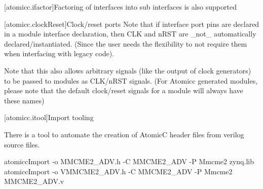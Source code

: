 [atomicc.ifactor]{Factoring of interfaces into sub interfaces is also supported}

[atomicc.clockReset]{Clock/reset ports}
Note that if interface port pins are declared in a module interface declaration, then
CLK and nRST are _not_ automatically declared/instantiated.  (Since the user needs the
flexibility to not require them when interfacing with legacy code).

Note that this also allows arbitrary signals (like the output of clock generators) to be
passed to modules as CLK/nRST signals.  (For Atomicc generated modules, please note that the
default clock/reset signals for a module will always have these names)

[atomicc.itool]{Import tooling}

There is a tool to automate the creation of AtomicC header files from verilog source files.
\begin{example}
\begin{codeblock}
     atomiccImport -o MMCME2_ADV.h -C MMCME2_ADV -P Mmcme2 zynq.lib
     atomiccImport -o VMMCME2_ADV.h -C MMCME2_ADV -P Mmcme2 MMCME2_ADV.v
\end{codeblock}
\end{example}
